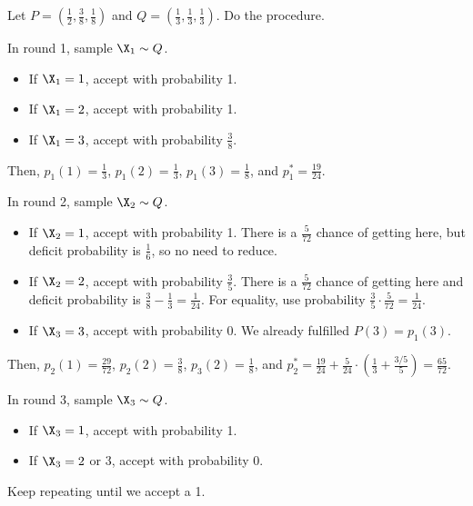 \documentclass[class=co432,notes,tikz]{agony}
\begin{document}
\begin{example}
  Let $P = (\frac12,\frac38,\frac18)$ and $Q = (\frac13,\frac13,\frac13)$.
  Do the procedure.
\end{example}
\begin{sol}
  In round 1, sample $\X_1 \sim Q$.
  \begin{itemize}[nosep]
    \item If $\X_1 = 1$, accept with probability 1.
    \item If $\X_1 = 2$, accept with probability 1.
    \item If $\X_1 = 3$, accept with probability $\frac38$.
  \end{itemize}
  Then, $p_1(1) = \frac13$, $p_1(2) = \frac13$, $p_1(3) = \frac18$, and $p_1^* = \frac{19}{24}$.

  In round 2, sample $\X_2 \sim Q$.
  \begin{itemize}[nosep]
    \item If $\X_2 = 1$, accept with probability 1.
          There is a $\frac{5}{72}$ chance of getting here,
          but deficit probability is $\frac16$, so no need to reduce.
    \item If $\X_2 = 2$, accept with probability $\frac35$.
          There is a $\frac{5}{72}$ chance of getting here and
          deficit probability is $\frac38 - \frac13 = \frac{1}{24}$.
          For equality, use probability $\frac{3}{5}\cdot\frac{5}{72} = \frac{1}{24}$.
    \item If $\X_3 = 3$, accept with probability 0.
          We already fulfilled $P(3) = p_1(3)$.
  \end{itemize}
  Then, $p_2(1) = \frac{29}{72}$, $p_2(2) = \frac38$, $p_3(2) = \frac18$,
  and $p_2^* = \frac{19}{24} + \frac{5}{24}\cdot(\frac13+\frac{3/5}{5}) = \frac{65}{72}$.

  In round 3, sample $\X_3 \sim Q$.
  \begin{itemize}[nosep]
    \item If $\X_3 = 1$, accept with probability 1.
    \item If $\X_3 = 2$ or 3, accept with probability 0.
  \end{itemize}
  Keep repeating until we accept a 1.
\end{sol}
\end{document}
